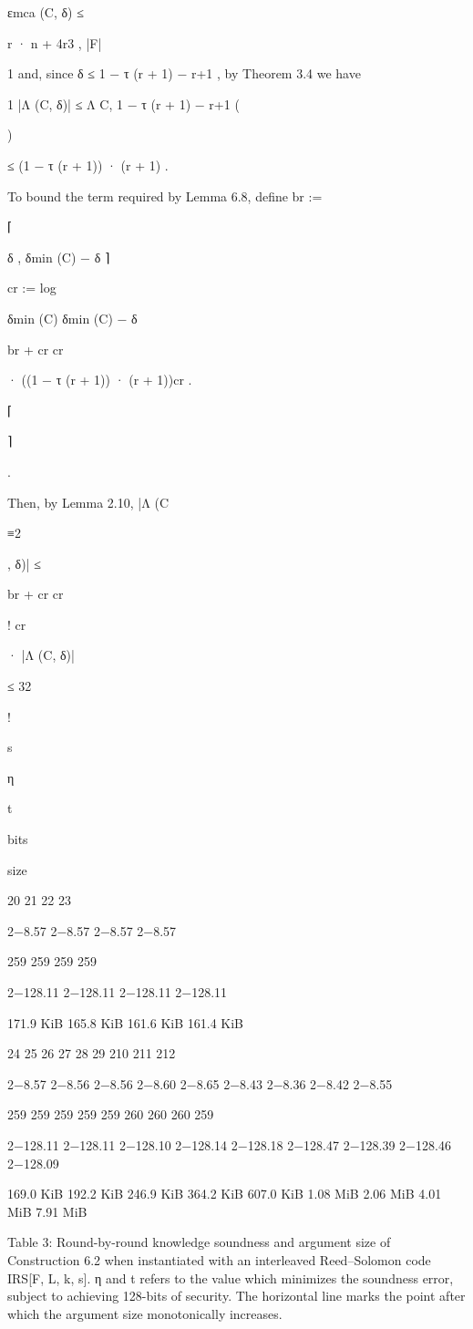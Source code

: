 \documentclass[11pt]{article}
\begin{document}
εmca (C, δ) ≤

r · n + 4r3
,
|F|

1
and, since δ ≤ 1 − τ (r + 1) − r+1
, by Theorem 3.4 we have

1
|Λ (C, δ)| ≤ Λ C, 1 − τ (r + 1) −
r+1
(

)

≤ (1 − τ (r + 1)) · (r + 1) .

To bound the term required by Lemma 6.8, define
br :=

⌈

δ
,
δmin (C) − δ
⌉

cr := log

δmin (C)
δmin (C) − δ

br + cr
cr

· ((1 − τ (r + 1)) · (r + 1))cr .

⌈

⌉

.

Then, by Lemma 2.10,
|Λ (C

≡2

, δ)| ≤

br + cr
cr

!
cr

· |Λ (C, δ)|

≤
32

!

s

η

t

bits

size

20
21
22
23

2−8.57
2−8.57
2−8.57
2−8.57

259
259
259
259

2−128.11
2−128.11
2−128.11
2−128.11

171.9 KiB
165.8 KiB
161.6 KiB
161.4 KiB

24
25
26
27
28
29
210
211
212

2−8.57
2−8.56
2−8.56
2−8.60
2−8.65
2−8.43
2−8.36
2−8.42
2−8.55

259
259
259
259
259
260
260
260
259

2−128.11
2−128.11
2−128.10
2−128.14
2−128.18
2−128.47
2−128.39
2−128.46
2−128.09

169.0 KiB
192.2 KiB
246.9 KiB
364.2 KiB
607.0 KiB
1.08 MiB
2.06 MiB
4.01 MiB
7.91 MiB

Table 3: Round-by-round knowledge soundness and argument size of Construction 6.2 when instantiated with an interleaved Reed–Solomon code IRS[F, L, k, s]. η and t refers to the value which minimizes
the soundness error, subject to achieving 128-bits of security. The horizontal line marks the point after
which the argument size monotonically increases.
\end{document}
